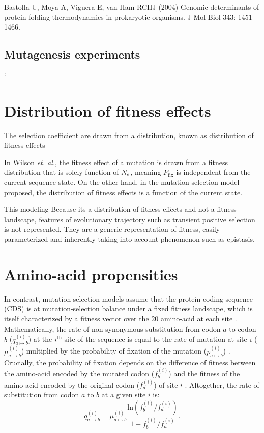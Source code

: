 Bastolla U, Moya A, Viguera E, van Ham RCHJ (2004) Genomic determinants of protein folding thermodynamics in prokaryotic organisms. J Mol Biol 343: 1451–1466.

\subsection{Mutagenesis experiments}

`
\section{Distribution of fitness effects}

The selection coefficient are drawn from a distribution, known as distribution of fitness effects
\citep{Welch2008}

In Wilson \textit{et. al.}, the fitness effect of a mutation is drawn from a fitness distribution that is solely function of $N_{\textrm{e}}$, meaning ${P_{\mathrm{fix}}}$ is independent from the current sequence state.
On the other hand, in the mutation-selection model proposed, the distribution of fitness effects is a function of the current state.

This modeling 
Because its a distribution of fitness effects and not a fitness landscape, features of evolutionary trajectory such as transient positive selection is not represented.
They are a generic representation of fitness, easily parameterized and inherently taking into account phenomenon such as epistasis. 

\section{Amino-acid propensities}

In contrast, mutation-selection models assume that the protein-coding sequence (CDS) is at mutation-selection balance under a fixed fitness landscape, which is itself characterized by a fitness vector over the $20$ amino-acid at each site \citep{Yang2008, Halpern1998, Rodrigue2010}. Mathematically, the rate of non-synonymous \gls{substitution} from \gls{codon} $a$ to \gls{codon} $b$ ($q_{a \mapsto b}^{(i)}$) at the $i^{\mathrm{th}}$ site of the sequence is equal to the rate of mutation at site $i$ ($\mu_{a \mapsto b}^{(i)}$) multiplied by the probability of fixation of the mutation ($p_{a \mapsto b}^{(i)}$) \citep{kimura_neutral_1983}. Crucially, the probability of fixation depends on the difference of fitness between the amino-acid encoded by the mutated \gls{codon} ($f_b^{(i)}$) and the fitness of the amino-acid encoded by the original \gls{codon} ($f_a^{(i)}$) of site $i$ \citep{wright_evolution_1931, fisher_genetical_1930}. Altogether, the rate of \gls{substitution} from \gls{codon} $a$ to $b$ at a given site $i$ is:
\begin{equation}
q_{a \mapsto b}^{(i)} = \mu_{a \mapsto b}^{(i)} \dfrac{\mathrm{ln}(f_b^{(i)} / f_a^{(i)})}{1 - f_b^{(i)} / f_a^{(i)}}.
\end{equation}

